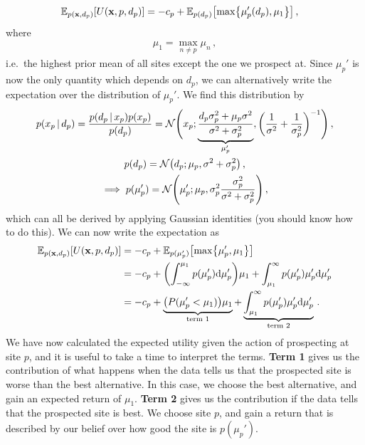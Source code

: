 \documentclass[a4paper]{article}
\theoremstyle{definition}
\begin{document}
\begin{align}
\Exp{p(\vx, d_p)}{U(\vx, p, d_p)} &= -c_p + \Exp{p(d_p)}{\max \left\{\mu_p'(d_p), \mu_1\right\}} \,,
\end{align}
where
\begin{align}
\mu_1 = \max_{n\neq p} \mu_n\,, \label{eq:highest-other}
\end{align}
i.e.~the highest prior mean of all sites except the one we prospect at. Since $\mu_p'$ is now the only quantity which depends on $d_p$, we can alternatively write the expectation over the distribution of $\mu_p'$. We find this distribution by
\begin{gather}
p(x_p\given d_p) = \frac{p(d_p\given x_p)p(x_p)}{p(d_p)} = \mathcal{N}\Bigg(x_p; \underbrace{\frac{d_p\sigma_p^2 + \mu_p\sigma^2}{\sigma^2 + \sigma^2_p}}_{\mu_p'}, \left(\frac{1}{\sigma^2} + \frac{1}{\sigma_p^2}\right)\inv\Bigg) \,, \\
p(d_p) = \NormDist{d_p; \mu_p, \sigma^2 + \sigma_p^2} \,, \\
\implies p(\mu'_p) = \NormDist{\mu_p'; \mu_p, \sigma^2_p \frac{\sigma^2_p}{\sigma^2 + \sigma_p^2}} \,,
\end{gather}
which can all be derived by applying Gaussian identities (you should know how to do this).
We can now write the expectation as
\begin{align}
\Exp{p(\vx, d_p)}{U(\vx, p, d_p)} &= -c_p + \Exp{p(\mu'_p)}{\max \left\{\mu_p', \mu_1\right\}} \\
&= -c_p + \left(\int_{-\infty}^{\mu_1} p(\mu_p') \calcd{\mu_p'}\right)\mu_1 + \int_{\mu_1}^\infty p(\mu_p') \mu_p' \calcd{\mu_p'}  \\
&= -c_p + \underbrace{\left(P(\mu_p' < \mu_1)\right)\mu_1}_{\text{term 1}} + \underbrace{\int_{\mu_1}^\infty p(\mu_p') \mu_p' \calcd{\mu_p'}}_{\text{term 2}} \,.
\end{align}
We have now calculated the expected utility given the action of prospecting at site $p$, and it is useful to take a time to interpret the terms. \textbf{Term 1} gives us the contribution of what happens when the data tells us that the prospected site is worse than the best alternative. In this case, we choose the best alternative, and gain an expected return of $\mu_1$. \textbf{Term 2} gives us the contribution if the data tells that the prospected site is best. We choose site $p$, and gain a return that is described by our belief over how good the site is $p(\mu_p')$.
\end{document}
